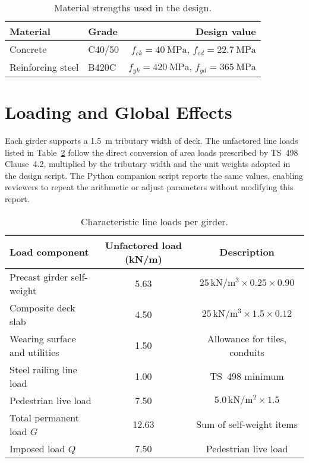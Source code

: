 \documentclass[12pt,a4paper]{report}
\begin{document}
\begin{table}[h]
\centering
\begin{tabular}{llr}
\toprule
Material & Grade & Design value \\
\midrule
Concrete & C40/50 & $f_{ck}=\SI{40}{\mega\pascal}$, $f_{cd}=\SI{22.7}{\mega\pascal}$ \\
Reinforcing steel & B420C & $f_{yk}=\SI{420}{\mega\pascal}$, $f_{yd}=\SI{365}{\mega\pascal}$ \\
\bottomrule
\end{tabular}
\caption{Material strengths used in the design.}
\label{tab:materials}
\end{table}

\section{Loading and Global Effects}
Each girder supports a \SI{1.5}{\meter} tributary width of deck. The unfactored line loads listed in Table~\ref{tab:loads} follow the direct conversion of area loads prescribed by TS~498 Clause~4.2, multiplied by the tributary width and the unit weights adopted in the design script. The Python companion script reports the same values, enabling reviewers to repeat the arithmetic or adjust parameters without modifying this report.

\begin{table}[h]
\centering
\begin{tabular}{lcc}
\toprule
Load component & Unfactored load (kN/m) & Description \\
\midrule
Precast girder self-weight & 5.63 & $25\,\mathrm{kN/m^3}\times0.25\times0.90$ \\
Composite deck slab & 4.50 & $25\,\mathrm{kN/m^3}\times1.5\times0.12$ \\
Wearing surface and utilities & 1.50 & Allowance for tiles, conduits \\
Steel railing line load & 1.00 & TS~498 minimum \\
Pedestrian live load & 7.50 & $5.0\,\mathrm{kN/m^2}\times1.5$ \\
\midrule
Total permanent load $G$ & 12.63 & Sum of self-weight items \\
Imposed load $Q$ & 7.50 & Pedestrian live load \\
\bottomrule
\end{tabular}
\caption{Characteristic line loads per girder.}
\label{tab:loads}
\end{table}
\end{document}
